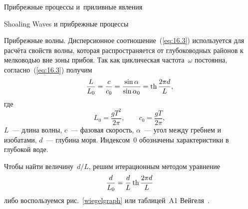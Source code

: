 \begin{chapter}{Прибрежные процессы и~приливные явления}
\begin{section}{Shoaling Waves и прибрежные процессы}
\begin{paragraph}{Прибрежные волны.}
Дисперсионное соотношение~(\ref{eq:16.3}) используется для расчёта свойств
волны, которая распространяется от глубоководных районов к мелководью
вне зоны прибоя. Так как циклическая частота~$\omega$ постоянна, 
согласно~(\ref{eq:16.3}) получим
\begin{equation}\label{eq:intermed}
 \frac{L}{L_{0}} = \frac{c}{c_{0}}=\frac{\sin \alpha }{\sin \alpha _{0}} 
                 = \mathop{\mathrm{th}}\nolimits \frac{2 \pi d}{L}, 
\end{equation}
где
\begin{equation}\label{eq:Lzero}
 L_{0} = \frac{g T^{2}}{2 \pi }, \qquad 
 c_{0} = \frac{g T}{2 \pi }, 
\end{equation}
$L$~--- длина волны, $c$~--- фазовая скорость, $\alpha $~--- угол
между гребнем и изобатами, $d$~--- глубина моря. Индексом~$0$
обозначены характеристики в глубокой воде.
%

Чтобы найти величину~$d/L$, решим итерационным методом уравнение
\begin{equation}\label{eq:intermediate}
 \frac{d}{L_{0}} = \frac{d}{L} \mathop{\mathrm{th}}\nolimits \frac{2 \pi d}{L} 
\end{equation}
либо воспользуемся рис.~\ref{wiegelgraph} или таблицей~A1 
Вейгеля~\cite{Wiegel:1964}.
%


\end{paragraph}
\end{section}
\end{chapter}
